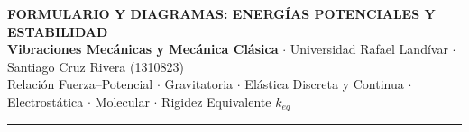 \documentclass[10pt,a4paper]{article}
\begin{document}
\small

\begin{center}
  {\fontsize{13pt}{15pt}\selectfont \textbf{\color{urlblue}FORMULARIO Y DIAGRAMAS: ENERGÍAS POTENCIALES Y ESTABILIDAD}} \\
  \vspace{1mm}
  {\footnotesize \color{darkgray} \textbf{Vibraciones Mecánicas y Mecánica Clásica} $\cdot$ Universidad Rafael Landívar $\cdot$ Santiago Cruz Rivera (1310823)} \\
  \vspace{0.5mm}
  {\scriptsize \color{tealshade} Relación Fuerza--Potencial $\cdot$ Gravitatoria $\cdot$ Elástica Discreta y Continua $\cdot$ Electrostática $\cdot$ Molecular $\cdot$ Rigidez Equivalente $k_{eq}$}
\end{center}
\vspace{-2mm}
\noindent\textcolor{linegray}{\rule{\linewidth}{1pt}}
\vspace{-1.5mm}
\end{document}
